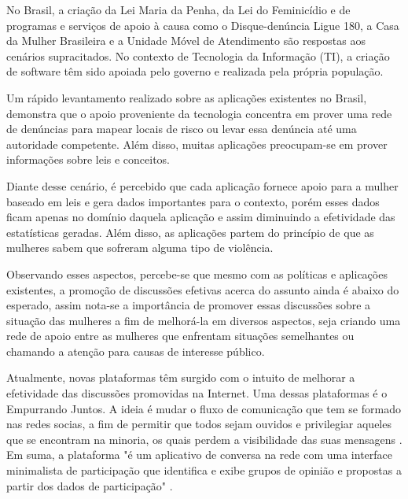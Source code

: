 No Brasil, a criação da Lei Maria da Penha, da Lei do Feminicídio e de programas e serviços de apoio à causa 
como o Disque-denúncia Ligue 180, a Casa da Mulher Brasileira e a Unidade Móvel de Atendimento são respostas aos cenários supracitados. No contexto de Tecnologia da Informação (TI), a criação de software têm sido apoiada pelo governo e realizada pela própria população.

Um rápido levantamento realizado sobre as aplicações existentes no Brasil, demonstra que o apoio proveniente da tecnologia concentra em prover uma rede de denúncias para mapear locais de risco ou levar essa denúncia até uma autoridade competente. Além disso, muitas aplicações preocupam-se em prover informações sobre leis e conceitos.

Diante desse cenário, é percebido que cada aplicação fornece apoio para a mulher baseado em leis e gera dados importantes para o contexto, porém esses dados ficam apenas no domínio daquela aplicação e assim diminuindo a efetividade das estatísticas geradas. Além disso, as aplicações partem do princípio de que as mulheres sabem que sofreram alguma tipo de violência. 

Observando esses aspectos, percebe-se que mesmo com as políticas e aplicações existentes, a promoção de discussões efetivas acerca do assunto ainda é abaixo do esperado, assim nota-se a importância de promover essas discussões sobre a situação das mulheres a fim de melhorá-la em diversos aspectos, seja criando uma rede de apoio entre as mulheres que enfrentam situações semelhantes ou chamando a atenção para causas de interesse público.


Atualmente, novas plataformas têm surgido com o intuito de melhorar a efetividade das discussões promovidas na Internet. Uma dessas plataformas é o Empurrando Juntos. A ideia é mudar o fluxo de comunicação que tem se formado nas redes socias, a fim de permitir que todos sejam ouvidos e privilegiar aqueles que
se encontram na minoria, os quais perdem a visibilidade das suas mensagens \cite{empurrandojuntos}. Em suma, a plataforma "é um aplicativo de conversa na rede com uma interface minimalista de participação que identifica e exibe grupos de opinião e propostas a partir dos dados de participação" \cite{empurrandojuntos}.

